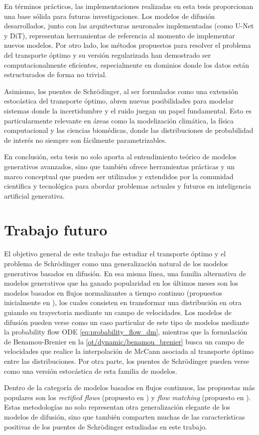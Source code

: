 En términos prácticos, las implementaciones realizadas en esta tesis proporcionan una base sólida para futuras investigaciones. Los modelos de difusión desarrollados, junto con las arquitecturas neuronales implementadas (como U-Net y DiT), representan herramientas de referencia al momento de implementar nuevos modelos. Por otro lado, los métodos propuestos para resolver el problema del transporte óptimo y su versión regularizada han demostrado ser computacionalmente eficientes, especialmente en dominios donde los datos están estructurados de forma no trivial.

Asimismo, los puentes de Schrödinger, al ser formulados como una extensión estocástica del transporte óptimo, abren nuevas posibilidades para modelar sistemas donde la incertidumbre y el ruido juegan un papel fundamental. Esto es particularmente relevante en áreas como la modelización climática, la física computacional y las ciencias biomédicas, donde las distribuciones de probabilidad de interés no siempre son fácilmente parametrizables.

En conclusión, esta tesis no solo aporta al entendimiento teórico de modelos generativos avanzados, sino que también ofrece herramientas prácticas y un marco conceptual que pueden ser utilizados y extendidos por la comunidad científica y tecnológica para abordar problemas actuales y futuros en inteligencia artificial generativa.

\section*{Trabajo futuro}

El objetivo general de este trabajo fue estudiar el transporte óptimo y el problema de Schrödinger como una generalización natural de los modelos generativos basados en difusión. En esa misma línea, una familia alternativa de modelos generativos que ha ganado popularidad en los últimos meses son los modelos basados en flujos normalizantes a tiempo continuo (propuestos inicialmente en \cite{chen2019neuralordinarydifferentialequations}), los cuales consisten en transformar una distribución en otra guiando su trayectoria mediante un campo de velocidades. Los modelos de difusión pueden verse como un caso particular de este tipo de modelos mediante la probability flow ODE \eqref{eq:probability_flow_dm}, mientras que la formulación de Benamou-Brenier en la \autoref{ot/dynamic/benamou_brenier} busca un campo de velocidades que realice la interpolación de McCann asociada al transporte óptimo entre las distribuciones. Por otra parte, los puentes de Schrödinger pueden verse como una versión estocástica de esta familia de modelos.

Dentro de la categoría de modelos basados en flujos continuos, las propuestas más populares son los \textit{rectified flows} (propuesto en \cite{liu2022flowstraightfastlearning}) y \textit{flow matching} (propuesto en \cite{lipman2023flowmatchinggenerativemodeling}). Estas metodologías no solo representan otra generalización elegante de los modelos de difusión, sino que también comparten muchas de las características positivas de los puentes de Schrödinger estudiadas en este trabajo.